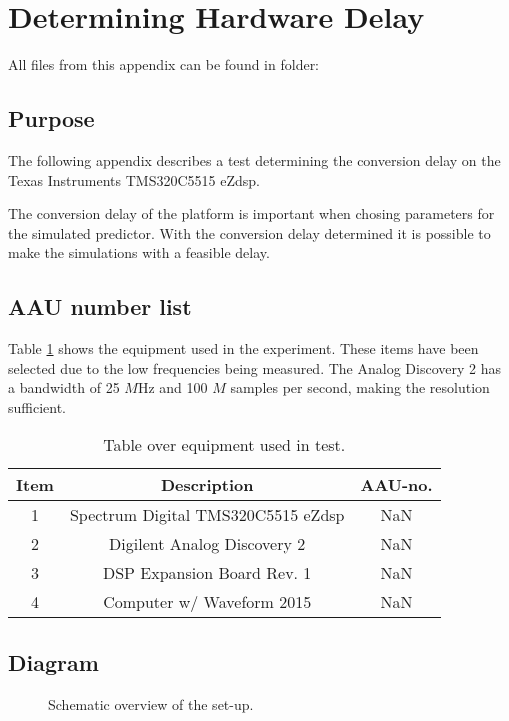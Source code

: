 \section{Determining Hardware Delay} \label{sec:HardwareDelay}

All files from this appendix can be found in folder: \\

\subsection{Purpose}
The following appendix describes a test determining the conversion delay on the Texas Instruments TMS320C5515 eZdsp.

The conversion delay of the platform is important when chosing parameters for the simulated predictor. With the conversion delay determined it is possible to make the simulations with a feasible delay. 

\subsection{AAU number list}
Table \ref{tab:MeasDelayTable} shows the equipment used in the experiment. These items have been selected due to the low frequencies being measured. The Analog Discovery 2 has a bandwidth of 25 $M$Hz and 100 $M$ samples per second, making the resolution sufficient.  
\begin{table}[H]
	\centering
	\begin{tabular}{ c c c } \toprule
		{Item}	& {Description} 						& {AAU-no}. \\ \bottomrule 
		1	&	Spectrum Digital TMS320C5515 eZdsp	& NaN	\\
		2	&	Digilent Analog Discovery 2	& NaN		\\
		3	&	DSP Expansion Board Rev. 1 & NaN		\\
		4	&	Computer w/ Waveform 2015					& NaN		\\
		\bottomrule
	\end{tabular}
	\caption{Table over equipment used in test.}
	\label{tab:MeasDelayTable}
\end{table}

\subsection{Diagram}

\begin{figure}[H]
	\centering
	
	\caption{Schematic overview of the set-up.}
	\label{fig:SchematicDelayExperiment}
\end{figure}

